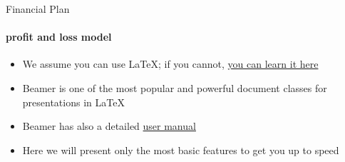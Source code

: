 \documentclass{beamer}
\newcommand{\hrefcol}[2]{\textcolor{cyan}{\href{#1}{#2}}}
\begin{document}
\begin{frame}{Financial Plan}
\framesubtitle{profit and loss model}
\begin{itemize}
\item We assume you can use \LaTeX; if you cannot,
\hrefcol{http://en.wikibooks.org/wiki/LaTeX/}{you can learn it here}
\item Beamer is one of the most popular and powerful document
classes for presentations in \LaTeX
\item Beamer has also a detailed
\hrefcol{http://www.ctan.org/tex-archive/macros/latex/contrib/beamer/doc/beameruserguide.pdf}{user
 manual}
\item Here we will present only the most basic features to get you up to speed
\end{itemize}
\end{frame}

%
\end{document}
